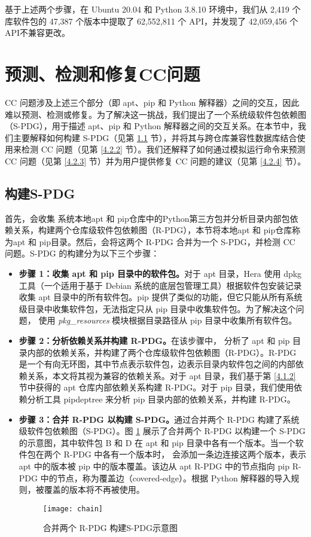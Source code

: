 基于上述两个步骤，在 Ubuntu 20.04 和 Python 3.8.10 环境中，我们从 2,419 个库软件包的 47,387 个版本中提取了 62,552,811 个 API，并发现了 42,059,456 个API不兼容更改。

\section{预测、检测和修复CC问题}\label{4.2}
CC 问题涉及上述三个部分（即 apt、pip 和 Python 解释器）之间的交互，因此难以预测、检测或修复。为了解决这一挑战，我们提出了一个系统级软件包依赖图（S-PDG），用于描述 apt、pip 和 Python 解释器之间的交互关系。在本节中，我们主要解释如何构建 S-PDG（见第 \ref{4.2.1} 节），并将其与跨仓库兼容性数据库结合使用来检测 CC 问题（见第 \ref{4.2.2} 节）。我们还解释了如何通过模拟运行命令来预测 CC 问题（见第 \ref{4.2.3} 节）并为用户提供修复 CC 问题的建议（见第 \ref{4.2.4} 节）。
\subsection{构建S-PDG}\label{4.2.1}
首先，\tool{}会收集 系统本地apt 和 pip仓库中的Python第三方包并分析目录内部包依赖关系，构建两个仓库级软件包依赖图（R-PDG），本节将本地apt 和 pip仓库称为apt 和 pip目录。然后，\tool{}会将这两个 R-PDG 合并为一个 S-PDG，并检测 CC 问题。S-PDG 的构建分为以下三个步骤：
\begin{itemize}
	\item \textbf{步骤 1：收集 apt 和 pip 目录中的软件包。}对于 apt 目录，Hera 使用 dpkg  工具（一个适用于基于 Debian 系统的底层包管理工具）根据软件包安装记录收集 apt 目录中的所有软件包。pip 提供了类似的功能，但它只能从所有系统级目录中收集软件包，无法指定只从 pip 目录中收集软件包。为了解决这个问题，\tool{} 使用 \textit{pkg\_resources} 模块根据目录路径从 pip 目录中收集所有软件包。
	\item \textbf{步骤 2：分析依赖关系并构建 R-PDG。}在该步骤中，\tool{} 分析了 apt 和 pip 目录内部的依赖关系，并构建了两个仓库级软件包依赖图（R-PDG）。R-PDG 是一个有向无环图，其中节点表示软件包，边表示目录内软件包之间的内部依赖关系，本文将其视为兼容的依赖关系。对于 apt 目录，我们基于第 \ref{4.1.2} 节中获得的 apt 仓库内部依赖关系构建 R-PDG。对于 pip 目录，我们使用依赖分析工具 pipdeptree  来分析 pip 目录内部的依赖关系，并构建 R-PDG。
	\item \textbf{步骤 3：合并 R-PDG 以构建 S-PDG。}\tool{}通过合并两个 R-PDG 构建了系统级软件包依赖图（S-PDG）。图 \ref{fig:PDG} 展示了合并两个 R-PDG 以构建一个 S-PDG 的示意图，其中软件包 B 和 D 在 apt 和 pip 目录中各有一个版本。当一个软件包在两个 R-PDG 中各有一个版本时，\tool{} 会添加一条边连接这两个版本，表示 apt 中的版本被 pip 中的版本覆盖。该边从 apt R-PDG 中的节点指向 pip R-PDG 中的节点，称为覆盖边（covered-edge）。根据 Python 解释器的导入规则，被覆盖的版本将不再被使用。
	\begin{figure}[htbp] %
		\centering
		\texttt{[image: chain]}
		\caption{合并两个 R-PDG 构建S-PDG示意图}
		\label{fig:PDG}
	\end{figure}
	
\end{itemize}
